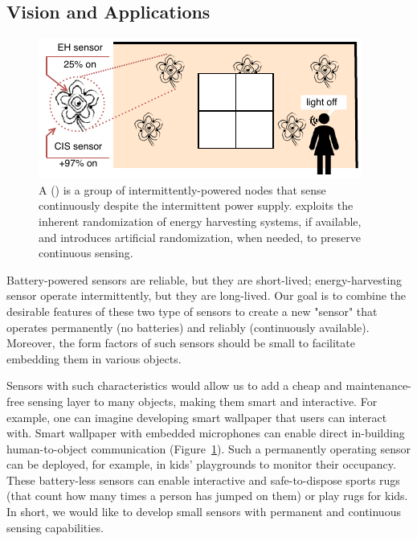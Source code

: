 \subsection{Vision and Applications}
%
\begin{figure}[t]
	\centering
	\includegraphics[width=\columnwidth]{figures/smart_fabric}
	\caption{A \fullsys (\sys) is a group of intermittently-powered nodes that sense continuously despite the intermittent power supply. \sys exploits the inherent randomization of energy harvesting systems, if available, and introduces artificial randomization, when needed, to preserve continuous sensing.
	}
	\label{fig:smart_fabric}
\end{figure}
%
Battery-powered sensors are reliable, but they are short-lived; energy-harvesting sensor operate intermittently, but they are long-lived. Our goal is to combine the desirable features of these two type of sensors to 
create a new "sensor" that operates permanently (no batteries) and reliably (continuously available).
Moreover, the form factors of such sensors should be small to facilitate embedding them in various objects. 

Sensors with such characteristics would allow us to add a cheap and maintenance-free sensing layer to many objects, making them smart and interactive. 
For example, one can imagine developing smart wallpaper that users can interact with. 
Smart wallpaper with embedded microphones can enable direct in-building human-to-object communication (Figure~\ref{fig:smart_fabric}). Such a permanently operating sensor can be deployed, for example, in kids' playgrounds to monitor their occupancy. These battery-less sensors can enable
 interactive and safe-to-dispose sports rugs (that count how many times a person has jumped on them) or play rugs for kids.
In short, we would like to develop small sensors with permanent and continuous sensing capabilities.  



